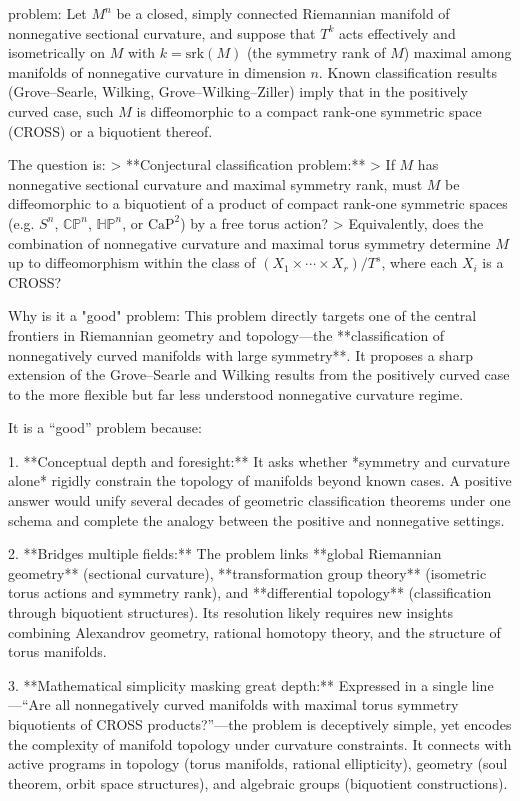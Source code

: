 problem:  
Let \( M^n \) be a closed, simply connected Riemannian manifold of nonnegative sectional curvature, and suppose that \( T^k \) acts effectively and isometrically on \( M \) with \( k = \mathrm{srk}(M) \) (the symmetry rank of \( M \)) maximal among manifolds of nonnegative curvature in dimension \( n\). Known classification results (Grove–Searle, Wilking, Grove–Wilking–Ziller) imply that in the positively curved case, such \( M \) is diffeomorphic to a compact rank-one symmetric space (CROSS) or a biquotient thereof.  

The question is:  
> **Conjectural classification problem:**  
> If \( M \) has nonnegative sectional curvature and maximal symmetry rank, must \( M \) be diffeomorphic to a biquotient of a product of compact rank-one symmetric spaces (e.g. \( S^n \), \( \mathbb{CP}^n \), \( \mathbb{HP}^n \), or \( \mathrm{CaP}^2 \)) by a free torus action?  
> Equivalently, does the combination of nonnegative curvature and maximal torus symmetry determine \( M \) up to diffeomorphism within the class of \((X_1 \times \cdots \times X_r)/T^s\), where each \( X_i \) is a CROSS?

Why is it a "good" problem:  
This problem directly targets one of the central frontiers in Riemannian geometry and topology—the **classification of nonnegatively curved manifolds with large symmetry**. It proposes a sharp extension of the Grove–Searle and Wilking results from the positively curved case to the more flexible but far less understood nonnegative curvature regime.

It is a “good” problem because:  

1. **Conceptual depth and foresight:**  
   It asks whether *symmetry and curvature alone* rigidly constrain the topology of manifolds beyond known cases. A positive answer would unify several decades of geometric classification theorems under one schema and complete the analogy between the positive and nonnegative settings.  

2. **Bridges multiple fields:**  
   The problem links **global Riemannian geometry** (sectional curvature), **transformation group theory** (isometric torus actions and symmetry rank), and **differential topology** (classification through biquotient structures). Its resolution likely requires new insights combining Alexandrov geometry, rational homotopy theory, and the structure of torus manifolds.

3. **Mathematical simplicity masking great depth:**  
   Expressed in a single line—“Are all nonnegatively curved manifolds with maximal torus symmetry biquotients of CROSS products?”—the problem is deceptively simple, yet encodes the complexity of manifold topology under curvature constraints. It connects with active programs in topology (torus manifolds, rational ellipticity), geometry (soul theorem, orbit space structures), and algebraic groups (biquotient constructions).

